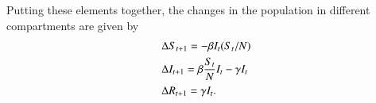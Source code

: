 Putting these elements together, the  changes in the population in different compartments are given by
\begin{equation}
	\label{eq:sirdyn}
	\begin{split}
	&	\Delta S_{t+1} = -\beta I_{t}(S_{t}/N) \\
	&	\Delta I_{t+1} = \beta \frac{S_{t}}{N}I_{t} - \gamma I_t \\
&		\Delta \Recovered_{t+1} = \gamma I_t.
	\end{split}
\end{equation}



